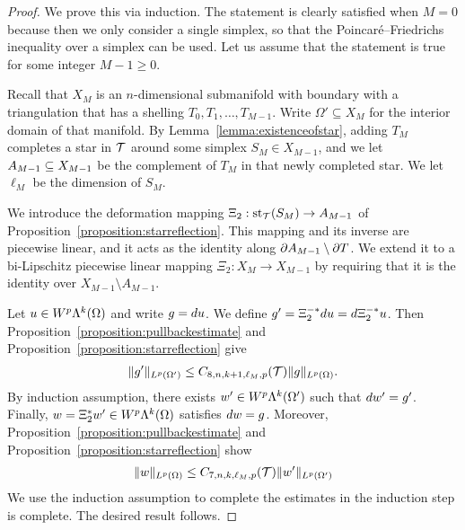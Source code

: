 \documentclass[10pt,a4paper]{article}
\begin{document}
\begin{proof}
    We prove this via induction. 
    The statement is clearly satisfied when $M=0$ because then we only consider a single simplex,
    so that the Poincar\'e--Friedrichs inequality over a simplex can be used. 
    Let us assume that the statement is true for some integer $M-1 \geq 0$.
    
    Recall that $X_M$ is an $n$-dimensional submanifold with boundary with a triangulation that has a shelling $T_0, T_1, \dots, T_{M-1}$. 
    Write $\Omega' \subseteq X_{M}$ for the interior domain of that manifold. 
    By Lemma~\ref{lemma:existenceofstar}, adding $T_{M}$ completes a star in ${\mathcal T}$ around some simplex $S_{M} \in X_{M-1}$, 
    and we let $A_{M-1} \subseteq X_{M-1}$ be the complement of $T_{M}$ in that newly completed star. 
    We let $\ell_{M}$ be the dimension of $S_{M}$.
    
    We introduce the deformation mapping $\Xi_{2} : \operatorname{st}_{{\mathcal T}}(S_M) \rightarrow A_{M-1}$ of Proposition~\ref{proposition:starreflection}. 
    This mapping and its inverse are piecewise linear, and it acts as the identity along $\partial A_{M-1} \setminus \partial T$.
    We extend it to a bi-Lipschitz piecewise linear mapping $\Xi_{2} : X_{M} \rightarrow X_{M-1}$ by requiring that it is the identity over $X_{M-1} \setminus A_{M-1}$.
    
    Let $u \in W^{p}\Lambda^{k}(\Omega)$ and write $g = d u$. We define $g' = \Xi_{2}^{-\ast} d u = d \Xi_{2}^{-\ast} u$. 
    Then Proposition~\ref{proposition:pullbackestimate} and Proposition~\ref{proposition:starreflection} give  
    \begin{align*}
        \| g' \|_{L^{p}(\Omega')}  
        \leq 
        C_{8,n,k+1,\ell_{M},p}({\mathcal T})
        \| g \|_{L^{p}(\Omega)}  
        .
    \end{align*}
    By induction assumption, there exists $w' \in W^{p}\Lambda^{k}(\Omega')$ such that $d w' = g'$.
    Finally, $w = \Xi_{2}^{\ast} w' \in W^{p}\Lambda^{k}(\Omega)$ satisfies $d w = g$.
    Moreover, Proposition~\ref{proposition:pullbackestimate} and Proposition~\ref{proposition:starreflection} show 
    \begin{align*}
        \| w \|_{L^{p}(\Omega)}  
        \leq 
        C_{7,n,k,\ell_{M},p}({\mathcal T})
        \| w' \|_{L^{p}(\Omega')} 
    \end{align*}
    We use the induction assumption to complete the estimates in the induction step is complete. The desired result follows. 
\end{proof}
\end{document}
